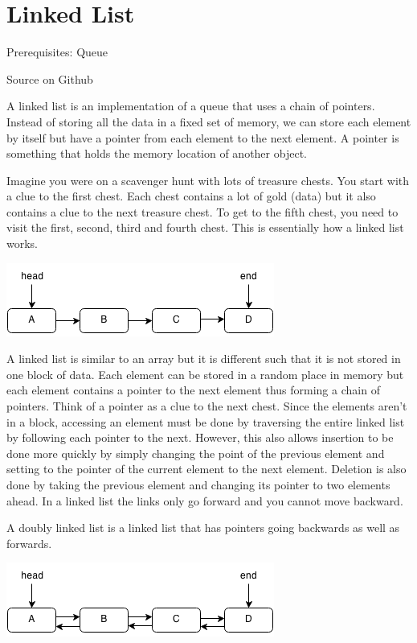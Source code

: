 \documentclass[11pt,oneside]{book}
\makeatletter
\def\maxwidth#1{\ifdim\Gin@nat@width>#1 #1\else\Gin@nat@width\fi}
\makeatother
\begin{document}
        \section{ Linked List }
        

Prerequisites: Queue

Source on Github

A linked list is an implementation of a queue that uses a chain of pointers. Instead of storing all the data in a fixed set of memory, we can store each element by itself but have a pointer from each element to the next element. A pointer is something that holds the memory location of another object.

Imagine you were on a scavenger hunt with lots of treasure chests. You start with a clue to the first chest. Each chest contains a lot of gold (data) but it also contains a clue to the next treasure chest. To get to the fifth chest, you need to visit the first, second, third and fourth chest. This is essentially how a linked list works.

\vspace{5px}\includegraphics[width=\maxwidth{\textwidth}]{linkedlist.png}

A linked list is similar to an array but it is different such that it is not stored in one block of data. Each element can be stored in a random place in memory but each element contains a pointer to the next element thus forming a chain of pointers. Think of a pointer as a clue to the next chest. Since the elements aren't in a block, accessing an element must be done by traversing the entire linked list by following each pointer to the next. However, this also allows insertion to be done more quickly by simply changing the point of the previous element and setting to the pointer of the current element to the next element. Deletion is also done by taking the previous element and changing its pointer to two elements ahead. In a linked list the links only go forward and you cannot move backward.

A doubly linked list is a linked list that has pointers going backwards as well as forwards.

\vspace{5px}\includegraphics[width=\maxwidth{\textwidth}]{doublelinkedlist.png}
\end{document}
